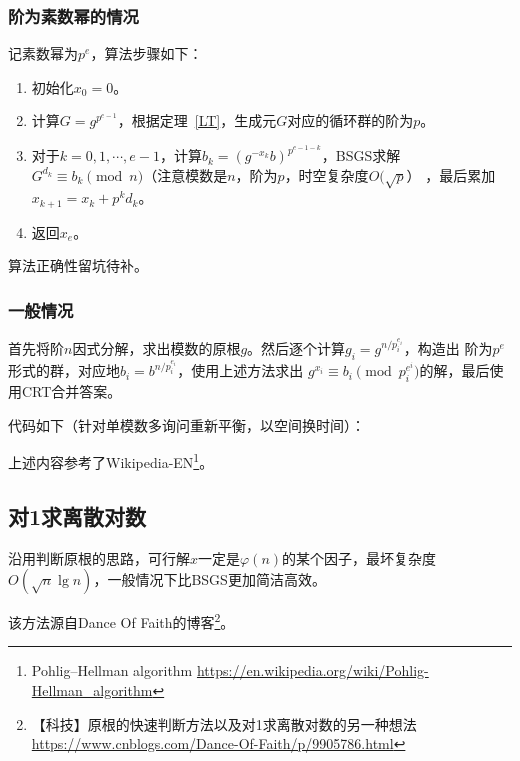 \subsubsection{阶为素数幂的情况}

记素数幂为$p^e$，算法步骤如下：

\begin{enumerate}
    \item 初始化$x_0=0$。
    \item 计算$G=g^{p^{e-1}}$，根据定理~\ref{LT}，生成元$G$对应的循环群的阶为$p$。
    \item 对于$k=0,1,\cdots,e-1$，计算$b_k=(g^{-x_k}b)^{p^{e-1-k}}$，BSGS求解
    $G^{d_k}\equiv b_k\pmod{n}$（注意模数是$n$，阶为$p$，时空复杂度$O(\sqrt{p}$）
    ，最后累加$x_{k+1}=x_k+p^kd_k$。
    \item 返回$x_e$。
\end{enumerate}

算法正确性留坑待补。

\subsubsection{一般情况}
首先将阶$n$因式分解，求出模数的原根$g$。然后逐个计算$g_i=g^{n/p_i^{e_i}}$，构造出
阶为$p^e$形式的群，对应地$b_i=b^{n/p_i^{e_i}}$，使用上述方法求出
$g^{x_i}\equiv b_i\pmod{p_i^{e^i}}$的解，最后使用CRT合并答案。

代码如下（针对单模数多询问重新平衡，以空间换时间）：


上述内容参考了Wikipedia-EN\footnote{
    Pohlig–Hellman algorithm
    \url{https://en.wikipedia.org/wiki/Pohlig-Hellman\_algorithm}
}。
\subsection{对1求离散对数}
沿用判断原根的思路，可行解$x$一定是$\varphi(n)$的某个因子，最坏复杂度
$O(\sqrt{n}\lg n)$，一般情况下比BSGS更加简洁高效。

该方法源自Dance Of Faith的博客\footnote{
    【科技】原根的快速判断方法以及对1求离散对数的另一种想法
    \url{https://www.cnblogs.com/Dance-Of-Faith/p/9905786.html}
}。
